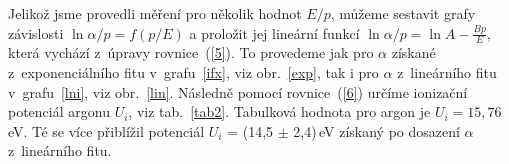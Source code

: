 \documentclass[a4paper,12pt]{article}
\newcommand{\e}{\text{e}}
\begin{document}
%			

\newpage
Jelikož jsme provedli měření pro několik hodnot $E/p$, můžeme sestavit grafy 
závislosti $\ln \alpha/p = f(p/E)$ a proložit jej lineární funkcí $\ln \alpha/p 
= \ln A - \frac{Bp}{E}$, která vychází z~úpravy rovnice~(\ref{5}). To provedeme 
jak pro $\alpha$ získané z~exponenciálního fitu v~grafu~\ref{ifx}, viz 
obr.~\ref{exp}, tak i pro $\alpha$ z~lineárního fitu v~grafu~\ref{lni}, viz 
obr.~\ref{lin}. Následně pomocí rovnice~(\ref{6}) určíme ionizační potenciál 
argonu $U_i$, viz tab.~\ref{tab2}. Tabulková hodnota pro argon je $U_i = 
15,76$\,eV. Té se více přiblížil potenciál $U_i$ = (14,5 $\pm$  2,4)\,eV 
získaný po 
dosazení $\alpha$ z~lineárního fitu.
 
\end{document}
